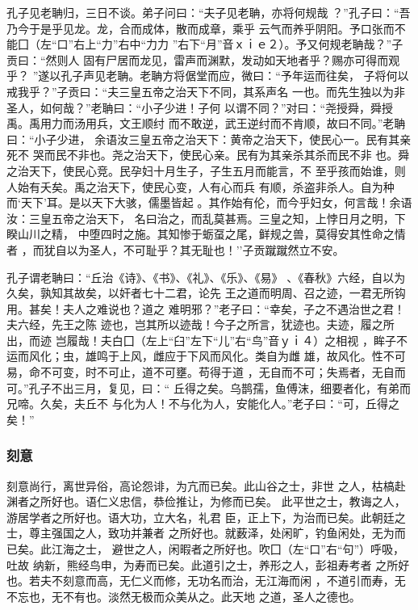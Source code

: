 \documentclass[]{article}
\begin{document}
孔子见老聃归，三日不谈。弟子问曰：``夫子见老聃，亦将何规哉
？''孔子曰：``吾乃今于是乎见龙。龙，合而成体，散而成章，乘乎
云气而养乎阴阳。予口张而不能囗（左``口''右上``力''右中``力力
''右下``月''音ｘｉｅ２）。予又何规老聃哉？''子贡曰：``然则人
固有尸居而龙见，雷声而渊默，发动如天地者乎？赐亦可得而观乎？
''遂以孔子声见老聃。老聃方将倨堂而应，微曰：``予年运而往矣，
子将何以戒我乎？''子贡曰：``夫三皇五帝之治天下不同，其系声名
一也。而先生独以为非圣人，如何哉？''老聃曰：``小子少进！子何
以谓不同？''对曰：``尧授舜，舜授禹。禹用力而汤用兵，文王顺纣
而不敢逆，武王逆纣而不肯顺，故曰不同。''老聃曰：``小子少进，
余语汝三皇五帝之治天下：黄帝之治天下，使民心一。民有其亲死不
哭而民不非也。尧之治天下，使民心亲。民有为其亲杀其杀而民不非
也。舜之治天下，使民心竞。民孕妇十月生子，子生五月而能言，不
至乎孩而始谁，则人始有夭矣。禹之治天下，使民心变，人有心而兵
有顺，杀盗非杀人。自为种而`天下'耳。是以天下大骇，儒墨皆起
。其作始有伦，而今乎妇女，何言哉！余语汝：三皇五帝之治天下，
名曰治之，而乱莫甚焉。三皇之知，上悖日月之明，下睽山川之精，
中堕四时之施。其知惨于蛎虿之尾，鲜规之兽，莫得安其性命之情者
，而犹自以为圣人，不可耻乎？其无耻也！''子贡蹴蹴然立不安。

孔子谓老聃曰：``丘治《诗》、《书》、《礼》、《乐》、《易》
、《春秋》六经，自以为久矣，孰知其故矣，以奸者七十二君，论先
王之道而明周、召之迹，一君无所钩用。甚矣！夫人之难说也？道之
难明邪？''老子曰：``幸矣，子之不遇治世之君！夫六经，先王之陈
迹也，岂其所以迹哉！今子之所言，犹迹也。夫迹，履之所出，而迹
岂履哉！夫白囗（左上``臼''左下``儿''右``鸟''音ｙｉ４）之相视
，眸子不运而风化；虫，雄鸣于上风，雌应于下风而风化。类自为雌
雄，故风化。性不可易，命不可变，时不可止，道不可壅。苟得于道
，无自而不可；失焉者，无自而可。''孔子不出三月，复见，曰：``
丘得之矣。乌鹊孺，鱼傅沫，细要者化，有弟而兄啼。久矣，夫丘不
与化为人！不与化为人，安能化人。''老子曰：``可，丘得之矣！''

\hypertarget{header-n774}{%
\subsubsection{刻意}\label{header-n774}}

刻意尚行，离世异俗，高论怨诽，为亢而已矣。此山谷之士，非世
之人，枯槁赴渊者之所好也。语仁义忠信，恭俭推让，为修而已矣。
此平世之士，教诲之人，游居学者之所好也。语大功，立大名，礼君
臣，正上下，为治而已矣。此朝廷之士，尊主强国之人，致功并兼者
之所好也。就薮泽，处闲旷，钓鱼闲处，无为而已矣。此江海之士，
避世之人，闲暇者之所好也。吹囗（左``口''右``句''）呼吸，吐故
纳新，熊经鸟申，为寿而已矣。此道引之士，养形之人，彭祖寿考者
之所好也。若夫不刻意而高，无仁义而修，无功名而治，无江海而闲
，不道引而寿，无不忘也，无不有也。淡然无极而众美从之。此天地
之道，圣人之德也。
\end{document}
